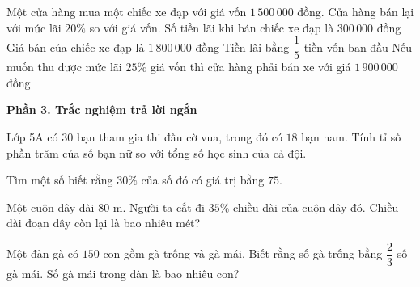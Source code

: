 \begin{ex} %
Một cửa hàng mua một chiếc xe đạp với giá vốn $1\,500\,000$ đồng. Cửa hàng bán lại với mức lãi $20\%$ so với giá vốn.
\choiceTF
{\True Số tiền lãi khi bán chiếc xe đạp là $300\,000$ đồng}
{\True Giá bán của chiếc xe đạp là $1\,800\,000$ đồng}
{\True Tiền lãi bằng $\dfrac{1}{5}$ tiền vốn ban đầu}
{Nếu muốn thu được mức lãi $25\%$ giá vốn thì cửa hàng phải bán xe với giá $1\,900\,000$ đồng}
\end{ex}

\textbf{Phần 3. Trắc nghiệm trả lời ngắn}

\begin{ex} %
Lớp 5A có $30$ bạn tham gia thi đấu cờ vua, trong đó có $18$ bạn nam. Tính tỉ số phần trăm của số bạn nữ so với tổng số học sinh của cả đội.
\end{ex}

\begin{ex} %
Tìm một số biết rằng $30\%$ của số đó có giá trị bằng $75$.
\end{ex}

\begin{ex} %
Một cuộn dây dài $80\text{ m}$. Người ta cắt đi $35\%$ chiều dài của cuộn dây đó. Chiều dài đoạn dây còn lại là bao nhiêu mét?
\end{ex}

\begin{ex} %
Một đàn gà có $150$ con gồm gà trống và gà mái. Biết rằng số gà trống bằng $\dfrac{2}{3}$ số gà mái. Số gà mái trong đàn là bao nhiêu con?
\end{ex}

